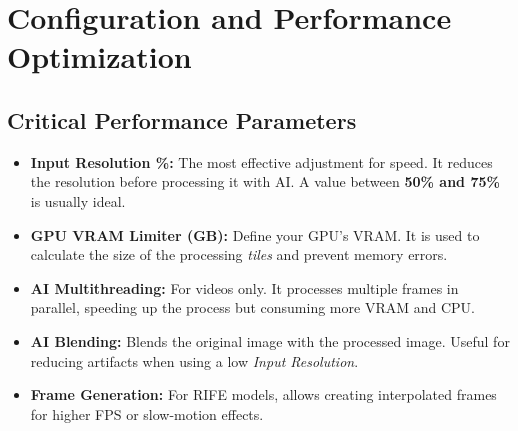 \documentclass[11pt, a4paper]{article}
\begin{document}
\section{Configuration and Performance Optimization}

\subsection{Critical Performance Parameters}
\begin{itemize}[leftmargin=*]
    \item \textbf{Input Resolution \%:} The most effective adjustment for speed. It reduces the resolution before processing it with AI. A value between \textbf{50\% and 75\%} is usually ideal.
    \item \textbf{GPU VRAM Limiter (GB):} Define your GPU's VRAM. It is used to calculate the size of the processing \textit{tiles} and prevent memory errors.
    \item \textbf{AI Multithreading:} For videos only. It processes multiple frames in parallel, speeding up the process but consuming more VRAM and CPU.
    \item \textbf{AI Blending:} Blends the original image with the processed image. Useful for reducing artifacts when using a low \textit{Input Resolution}.
    \item \textbf{Frame Generation:} For RIFE models, allows creating interpolated frames for higher FPS or slow-motion effects.
\end{itemize}
\end{document}
